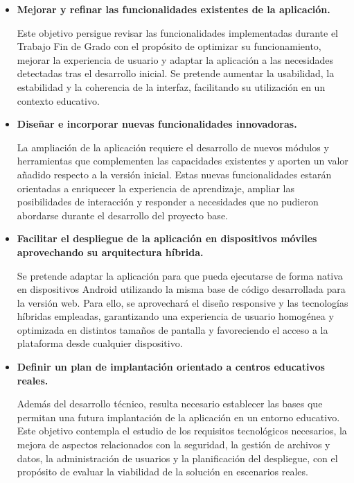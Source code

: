 \begin{itemize}

\item \textbf{Mejorar y refinar las funcionalidades existentes de la aplicación.}

Este objetivo persigue revisar las funcionalidades implementadas durante el Trabajo Fin de Grado con el propósito de optimizar su funcionamiento, mejorar la experiencia de usuario y adaptar la aplicación a las necesidades detectadas tras el desarrollo inicial. Se pretende aumentar la usabilidad, la estabilidad y la coherencia de la interfaz, facilitando su utilización en un contexto educativo.
\newpage
\item \textbf{Diseñar e incorporar nuevas funcionalidades innovadoras.}

La ampliación de la aplicación requiere el desarrollo de nuevos módulos y herramientas que complementen las capacidades existentes y aporten un valor añadido respecto a la versión inicial. Estas nuevas funcionalidades estarán orientadas a enriquecer la experiencia de aprendizaje, ampliar las posibilidades de interacción y responder a necesidades que no pudieron abordarse durante el desarrollo del proyecto base.

\item \textbf{Facilitar el despliegue de la aplicación en dispositivos móviles aprovechando su arquitectura híbrida.}

Se pretende adaptar la aplicación para que pueda ejecutarse de forma nativa en dispositivos Android utilizando la misma base de código desarrollada para la versión web. Para ello, se aprovechará el diseño responsive y las tecnologías híbridas empleadas, garantizando una experiencia de usuario homogénea y optimizada en distintos tamaños de pantalla y favoreciendo el acceso a la plataforma desde cualquier dispositivo.

\item \textbf{Definir un plan de implantación orientado a centros educativos reales.}

Además del desarrollo técnico, resulta necesario establecer las bases que permitan una futura implantación de la aplicación en un entorno educativo. Este objetivo contempla el estudio de los requisitos tecnológicos necesarios, la mejora de aspectos relacionados con la seguridad, la gestión de archivos y datos, la administración de usuarios y la planificación del despliegue, con el propósito de evaluar la viabilidad de la solución en escenarios reales.

\end{itemize}

